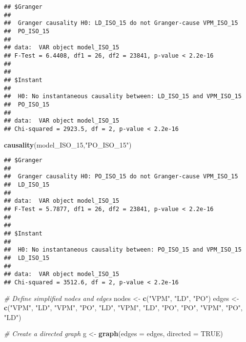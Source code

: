 \documentclass[
]{article}
\newenvironment{Shaded}{\begin{snugshade}}{\end{snugshade}}
\newcommand{\AttributeTok}[1]{\textcolor[rgb]{0.13,0.29,0.53}{#1}}
\newcommand{\CommentTok}[1]{\textcolor[rgb]{0.56,0.35,0.01}{\textit{#1}}}
\newcommand{\ConstantTok}[1]{\textcolor[rgb]{0.56,0.35,0.01}{#1}}
\newcommand{\FunctionTok}[1]{\textcolor[rgb]{0.13,0.29,0.53}{\textbf{#1}}}
\newcommand{\NormalTok}[1]{#1}
\newcommand{\OtherTok}[1]{\textcolor[rgb]{0.56,0.35,0.01}{#1}}
\newcommand{\StringTok}[1]{\textcolor[rgb]{0.31,0.60,0.02}{#1}}
\begin{document}
\begin{verbatim}
## $Granger
## 
##  Granger causality H0: LD_ISO_15 do not Granger-cause VPM_ISO_15
##  PO_ISO_15
## 
## data:  VAR object model_ISO_15
## F-Test = 6.4408, df1 = 26, df2 = 23841, p-value < 2.2e-16
## 
## 
## $Instant
## 
##  H0: No instantaneous causality between: LD_ISO_15 and VPM_ISO_15
##  PO_ISO_15
## 
## data:  VAR object model_ISO_15
## Chi-squared = 2923.5, df = 2, p-value < 2.2e-16
\end{verbatim}

\begin{Shaded}
\begin{Highlighting}[]
\FunctionTok{causality}\NormalTok{(model\_ISO\_15,}\StringTok{"PO\_ISO\_15"}\NormalTok{)}
\end{Highlighting}
\end{Shaded}

\begin{verbatim}
## $Granger
## 
##  Granger causality H0: PO_ISO_15 do not Granger-cause VPM_ISO_15
##  LD_ISO_15
## 
## data:  VAR object model_ISO_15
## F-Test = 5.7877, df1 = 26, df2 = 23841, p-value < 2.2e-16
## 
## 
## $Instant
## 
##  H0: No instantaneous causality between: PO_ISO_15 and VPM_ISO_15
##  LD_ISO_15
## 
## data:  VAR object model_ISO_15
## Chi-squared = 3512.6, df = 2, p-value < 2.2e-16
\end{verbatim}

\begin{Shaded}
\begin{Highlighting}[]
\CommentTok{\# Define simplified nodes and edges}
\NormalTok{nodes }\OtherTok{\textless{}{-}} \FunctionTok{c}\NormalTok{(}\StringTok{"VPM"}\NormalTok{, }\StringTok{"LD"}\NormalTok{, }\StringTok{"PO"}\NormalTok{)}
\NormalTok{edges }\OtherTok{\textless{}{-}} \FunctionTok{c}\NormalTok{(}\StringTok{"VPM"}\NormalTok{, }\StringTok{"LD"}\NormalTok{,}
           \StringTok{"VPM"}\NormalTok{, }\StringTok{"PO"}\NormalTok{,}
           \StringTok{"LD"}\NormalTok{, }\StringTok{"VPM"}\NormalTok{,}
           \StringTok{"LD"}\NormalTok{, }\StringTok{"PO"}\NormalTok{,}
           \StringTok{"PO"}\NormalTok{, }\StringTok{"VPM"}\NormalTok{,}
           \StringTok{"PO"}\NormalTok{, }\StringTok{"LD"}\NormalTok{)}

\CommentTok{\# Create a directed graph}
\NormalTok{g }\OtherTok{\textless{}{-}} \FunctionTok{graph}\NormalTok{(}\AttributeTok{edges =}\NormalTok{ edges, }\AttributeTok{directed =} \ConstantTok{TRUE}\NormalTok{)}
\end{Highlighting}
\end{Shaded}
\end{document}
